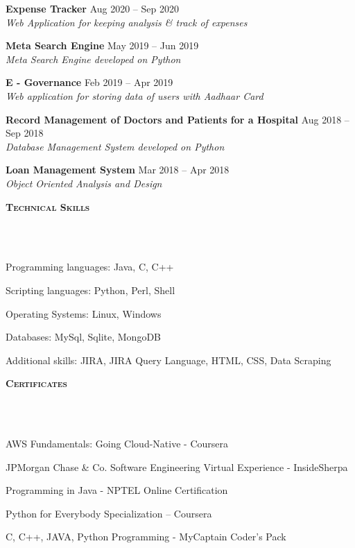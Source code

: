 \documentclass{article}
\newcommand{\header}[1]{{
\hspace*{-15pt}\vspace*{6pt} \textsc{#1}} \vspace*{-6pt} 
\lineunder
}
\newcommand{\lineunder}{
\vspace*{-8pt} \\ \hspace*{-18pt} 
\hrulefill \\
}
\newcommand{\project}[4]{{
\vspace*{2pt}%
\textbf{#1} #2 \hfill #3\\ \textit{#4} \vspace*{2pt}}
}
\renewcommand{\labelitemii}{
$\vcenter{\hbox{\tiny$\bullet$}}$\hspace*{-3pt}
}
\newenvironment{bullet-list-major}{
\begin{list}{\labelitemii}{\setlength\leftmargin{3pt} 
\topsep 0pt \itemsep -2pt}}{\vspace*{4pt}\end{list}
}
\begin{document}
    \project{Expense Tracker}{ }{ Aug 2020 -- Sep 2020}{Web Application for keeping analysis \& track of expenses}
    
    \project{Meta Search Engine}{ }{ May 2019 -- Jun 2019}{Meta Search Engine developed on Python}

    \project{E - Governance}{ }{ Feb 2019 -- Apr 2019}{Web application for storing data of users with  Aadhaar Card}
    
    \project{Record Management of Doctors and Patients for a Hospital}{ }{ Aug 2018 -- Sep 2018}{Database Management System developed on Python }
    
    \project{Loan Management System }{ }{ Mar 2018 -- Apr 2018}{Object Oriented Analysis and Design }
	
	
\vspace*{6pt}%
\header{\textbf{Technical Skills}}
    \begin{bullet-list-major}
    \item Programming languages: Java, C, C++
    \vspace{2pt}
    \item Scripting languages: Python, Perl, Shell
    \vspace{2pt}
    \item Operating Systems: Linux, Windows
    \vspace{2pt}
    \item Databases: MySql, Sqlite, MongoDB
    \vspace{2pt}
    \item Additional skills: JIRA, JIRA Query Language, HTML, CSS, Data Scraping
    \end{bullet-list-major}

\vspace*{6pt}%
\header{\textbf{Certificates}}
    \begin{bullet-list-major}
    \item  AWS Fundamentals: Going Cloud-Native - Coursera
    \vspace{2pt}
    \item  JPMorgan Chase \& Co. Software Engineering Virtual Experience - InsideSherpa
    \vspace{2pt}
    \item  Programming in Java - NPTEL Online Certification
    \vspace{2pt}
    \item  Python for Everybody Specialization – Coursera 
    \vspace{2pt}
    \item  C, C++, JAVA, Python Programming - MyCaptain Coder's Pack
    \vspace{2pt}
    \end{bullet-list-major}
\end{document}
